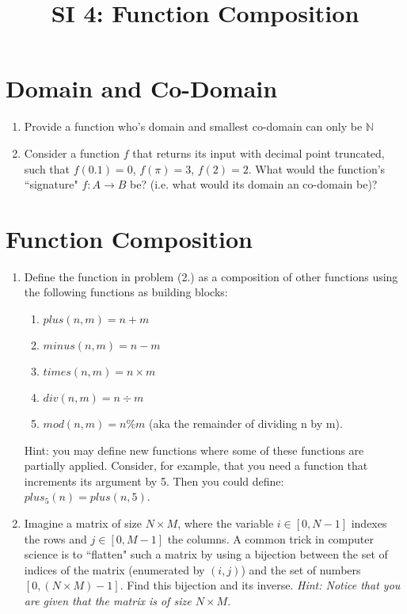\documentclass[12pt]{article}
\date{}
\author{}
\title{SI 4: Function Composition}
\begin{document}
	
	\maketitle
	\section{Domain and Co-Domain}
	\begin{enumerate}
		\item Provide a function who's domain and smallest co-domain can only be $\mathbb{N}$
		\item Consider a function $f$ that returns its input with decimal point truncated, such that $f(0.1) = 0$, $f(\pi) = 3$, $f(2) =2$. What would the function's ``signature" $f: A \to B$ be? (i.e. what would its domain an co-domain be)?
	\end{enumerate}
	\section{Function Composition}
	
	\begin{enumerate}[resume]
		\item Define the function in problem (2.) as a composition of other functions using the following functions as building blocks:
		\begin{enumerate}
			\item $plus(n,m) = n+m$
			\item $minus(n,m) = n-m$
			\item $times(n,m) = n \times m$
			\item $div(n,m) = n \div m$
			\item $mod(n,m) = n \% m$ (aka the remainder of dividing n by m).
		\end{enumerate}
		Hint: you may define new functions where some of these functions are partially applied. Consider, for example, that you need a function that increments its argument by 5. Then you could define: $plus_5(n) = plus(n,5)$.
		\item Imagine a matrix of size $N\times M$, where the variable $i\in [0,N-1]$ indexes the rows and $j \in [0,M-1]$ the columns. A common trick in computer science is to ``flatten" such a matrix by using a bijection between the set of indices of the matrix (enumerated by $(i,j)$) and the set of numbers $[0,(N\times M)-1]$. Find this bijection and its inverse. \textit{Hint: Notice that you are given that the matrix is of size $N\times M$.}
		\end{enumerate}

	
\end{document}
